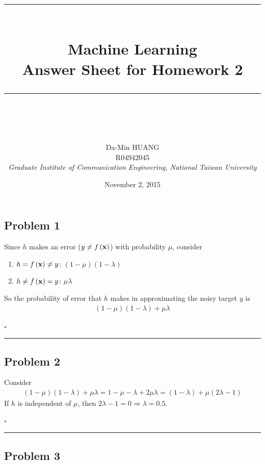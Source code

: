 \documentclass[12pt]{article}
\newcommand*{\QEDB}{\hfill\ensuremath{\square}}
\newcommand{\ParTh}[1]{\left(#1\right)}
\newcommand{\BF}[1]{{\bf#1}}
\newcommand{\horrule}[1]{\rule{\linewidth}{#1}}
\begin{document}
\baselineskip 6.5mm
\setlength{\parindent}{0pt}
\title{ 
\normalfont \normalsize 
\horrule{0.5pt} \\[0.4cm]
\huge { \Huge Machine Learning \\ \large Answer Sheet for Homework 2 }\\ %
\horrule{2pt} \\ [0.5cm]
}
\author{ { \Large Da-Min HUANG } \\
{\small R04942045} \\
{\small\textit{Graduate Institute of Communication Engineering, National Taiwan University}}
}
\date{November 2, 2015}
\maketitle

\subsection*{Problem 1}

Since $h$ makes an error ($y\neq f\ParTh{\BF{x}}$) with probability $\mu$, consider
\begin{enumerate}
\item $h=f\ParTh{\BF{x}}\neq y$: $\ParTh{1-\mu}\ParTh{1-\lambda}$
\item $h\neq f\ParTh{\BF{x}}=y$: $\mu\lambda$
\end{enumerate}
So the probability of error that $h$ makes in approximating the noisy target $y$ is
\begin{align}
\ParTh{1-\mu}\ParTh{1-\lambda}+\mu\lambda
\end{align}

\QEDB

\horrule{0.5pt}

\subsection*{Problem 2}

Consider
\begin{align}
\ParTh{1-\mu}\ParTh{1-\lambda}+\mu\lambda=1-\mu-\lambda+2\mu\lambda=\ParTh{1-\lambda}+\mu\ParTh{2\lambda-1}
\end{align}
If $h$ is independent of $\mu$, then $2\lambda-1=0\Rightarrow\lambda=0.5$.

\QEDB

\horrule{0.5pt}

\subsection*{Problem 3}
\end{document}
